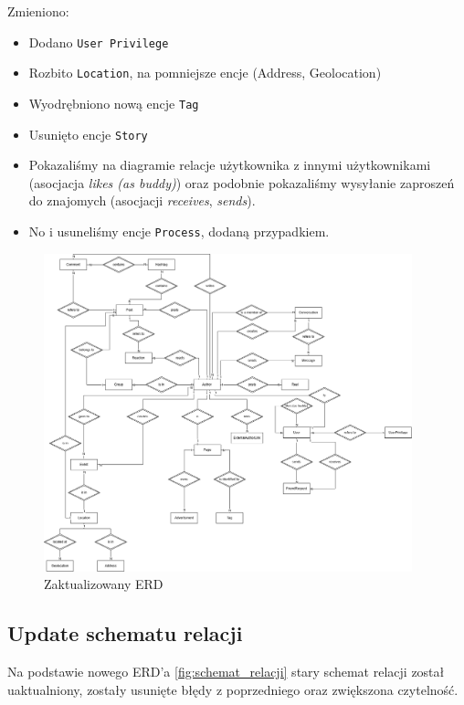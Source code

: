 \documentclass{article}
\begin{document}
Zmieniono:

\begin{itemize}
    \item Dodano \texttt{User Privilege}
    \item Rozbito \texttt{Location}, na pomniejsze encje (Address, Geolocation)
    \item Wyodrębniono nową encje \texttt{Tag}
    \item Usunięto encje \texttt{Story}
    \item Pokazaliśmy na diagramie relacje użytkownika z innymi użytkownikami (asocjacja \textit{likes (as buddy)}) oraz podobnie pokazaliśmy wysyłanie zaproszeń do znajomych (asocjacji \textit{receives}, \textit{sends}).
    \item No i usuneliśmy encje \texttt{Process}, dodaną przypadkiem.
\end{itemize}


\begin{figure}[htbp]
    \begin{center}
        \includegraphics[width=0.95\textwidth]{images/erd_8_1.png}
    \end{center}
    \caption{Zaktualizowany ERD}
    \label{fig:new_erd}
\end{figure}


\subsection{Update schematu relacji}

Na podstawie nowego ERD'a \ref{fig:schemat_relacji} stary schemat relacji został uaktualniony, zostały usunięte błędy z poprzedniego oraz zwiększona czytelność.
\end{document}
